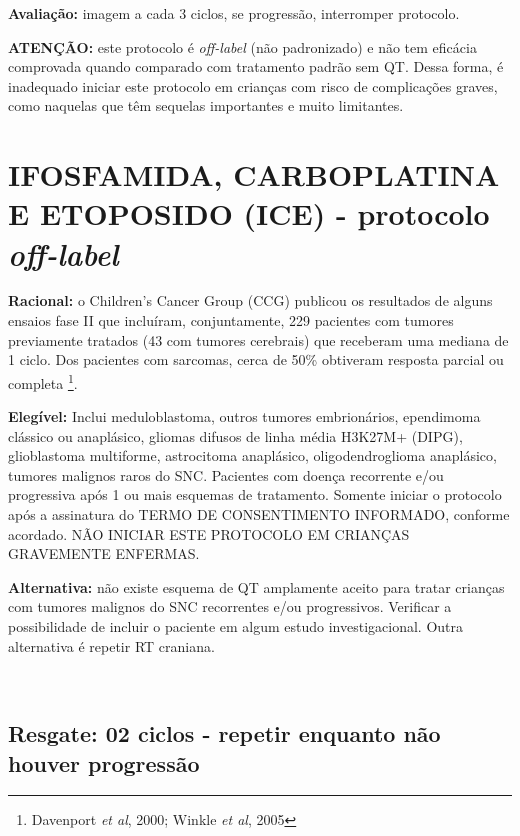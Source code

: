 \documentclass[11pt,a4paper,oldfontcommands]{memoir}
\begin{document}
\textbf{Avaliação:} imagem a cada 3 ciclos, se progressão, interromper protocolo.

\textbf{ATENÇÃO:} este protocolo é \textit{off-label} (não padronizado) e não tem eficácia comprovada quando comparado com tratamento padrão sem QT. Dessa forma, é inadequado iniciar este protocolo em crianças com risco de complicações graves, como naquelas que têm sequelas importantes e muito limitantes.\\
\cleardoublepage

\section{IFOSFAMIDA, CARBOPLATINA E ETOPOSIDO (ICE) - protocolo \textit{off-label}}
{\let\thefootnote\relax{}}
\textbf{Racional:} o Children's Cancer Group (CCG) publicou os resultados de alguns ensaios fase II que incluíram, conjuntamente, 229 pacientes com tumores previamente tratados (43 com tumores cerebrais) que receberam uma mediana de 1 ciclo. Dos pacientes com sarcomas, cerca de 50\% obtiveram resposta parcial ou completa \footnote{Davenport \textit{et al}, 2000; Winkle \textit{et al}, 2005}.

\textbf{Elegível:} Inclui meduloblastoma, outros tumores embrionários, ependimoma clássico ou anaplásico, gliomas difusos de linha média H3K27M+ (DIPG), glioblastoma multiforme, astrocitoma anaplásico, oligodendroglioma anaplásico, tumores malignos raros do SNC. Pacientes com doença recorrente e/ou progressiva após 1 ou mais esquemas de tratamento. Somente iniciar o protocolo após a assinatura do TERMO DE CONSENTIMENTO INFORMADO, conforme acordado. NÃO INICIAR ESTE PROTOCOLO EM CRIANÇAS GRAVEMENTE ENFERMAS.

\textbf{Alternativa:} não existe esquema de QT amplamente aceito para tratar crianças com tumores malignos do SNC recorrentes e/ou progressivos. Verificar a possibilidade de incluir o paciente em algum estudo investigacional. Outra alternativa é repetir RT craniana.

\hfill \\

\hfill  {}

\subsection{Resgate: 02 ciclos - repetir enquanto não houver progressão}
\end{document}
